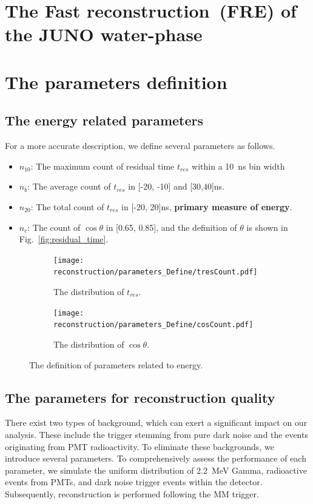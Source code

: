 \section{The Fast reconstruction~(FRE) of the JUNO water-phase}

\section{The parameters definition}
\subsection{The energy related parameters}
For a more accurate description, we define several parameters as follows.
\begin{itemize}
	\item $n_{10}$: The maximum count of residual time $t_{res}$ within a
	      \SI{10}{\nano s} bin width
	\item $n_{b}$: The average count of $t_{res}$ in [-20, -10] and
		      [30,40]\si{\nano s}.
	\item $n_{20}$: The total count of $t_{res}$ in [-20, 20]\si{\nano s},
	      \textbf{primary measure of energy}.
	\item $n_c$: The count of $\cos\theta$ in [0.65, 0.85], and the definition of $\theta$ is shown in Fig.~\ref{fig:residual_time}.
\end{itemize}

\begin{figure}[htbp]
	\centering
	\begin{subfigure}{0.5\textwidth}
		\centering
		\texttt{[image: reconstruction/parameters\_Define/tresCount.pdf]}
		\caption{The distribution of $t_{res}$.}
		\label{fig:n20def}
	\end{subfigure}%
	\begin{subfigure}{0.5\textwidth}
		\centering
		\texttt{[image: reconstruction/parameters\_Define/cosCount.pdf]}
		\caption{The distribution of $\cos\theta$.}
		\label{fig:nc}
	\end{subfigure}
	\caption{The definition of parameters related to energy.}
	\label{fig:dual}
\end{figure}

\subsection{The parameters for reconstruction quality}
There exist two types of background, which can exert a significant impact on our analysis. These include the trigger stemming from pure dark noise and the events originating from PMT radioactivity. To eliminate these backgrounds, we introduce several parameters. To comprehensively assess the performance of each parameter, we simulate the uniform distribution of \SI{2.2}{MeV} Gamma, radioactive events from PMTs, and dark noise trigger events within the detector. Subsequently, reconstruction is performed following the MM trigger.

